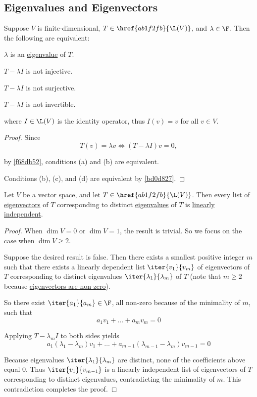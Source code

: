 \subsection{Eigenvalues and Eigenvectors}\label{bd04270}

\label{a96a1a4}

Suppose $V$ is finite-dimensional, $T\in\href{ab1f2fb}{\L(V)}$, and
$\lambda\in\F$. Then the following are equivalent:
\begin{enumerata}
  \item $\lambda$ is an \href{e174ec3}{eigenvalue} of $T$.
  \item $T-\lambda I$ is not injective.
  \item $T-\lambda I$ is not surjective.
  \item $T-\lambda I$ is not invertible.
\end{enumerata}

where $I\in\L(V)$ is the identity operator, thus $I(v)=v$ for all $v\in V$.

\begin{proof}
  Since
  $$
    T(v)=\lambda v\iff(T-\lambda I)v=0,
  $$

  by \autoref{f68db52}, conditions (a) and (b) are equivalent.

  Conditions (b), (c), and (d) are equivalent by \autoref{bd0d827}.
\end{proof}

\label{a272503}

Let $V$ be a vector space, and let $T\in\href{ab1f2fb}{\L(V)}$. Then every list
of \href{ac14802}{eigenvectors} of $T$ corresponding to distinct
\href{e174ec3}{eigenvalues} of $T$ is \href{c133a44}{linearly independent}.

\begin{proof}
  When $\dim V=0$ or $\dim V=1$, the result is trivial. So we focus on the case
  when $\dim V\geq2$.

  Suppose the desired result is false. Then there exists a smallest positive
  integer $m$ such that there exists a linearly dependent list
  $\iter{v_1}{v_m}$ of eigenvectors of $T$ corresponding to distinct
  eigenvalues $\iter{\lambda_1}{\lambda_m}$ of $T$ (note that $m\geq2$ because
  \href{ac14802}{eigenvectors are non-zero}).

  So there exist $\iter{a_1}{a_m}\in\F$, all non-zero because of the minimality
  of $m$, such that
  $$
    a_1v_1+\ldots+a_mv_m=0
  $$

  Applying $T-\lambda_mI$ to both sides yields
  $$
    a_1(\lambda_1-\lambda_m)v_1+\ldots+a_{m-1}(\lambda_{m-1}-\lambda_m)v_{m-1}=0
  $$

  Because eigenvalues $\iter{\lambda_1}{\lambda_m}$ are distinct, none of the
  coefficients above equal 0. Thus $\iter{v_1}{v_{m-1}}$ is a linearly
  independent list of eigenvectors of $T$ corresponding to distinct
  eigenvalues, contradicting the minimality of $m$. This contradiction
  completes the proof.
\end{proof}

